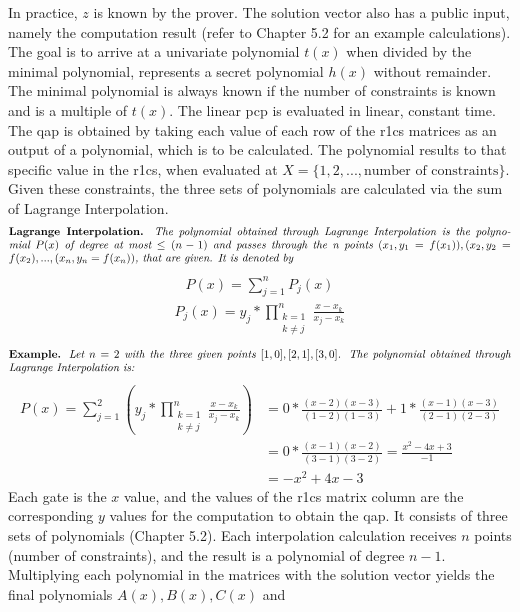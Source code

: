 In practice, \(z\) is known by the prover. The solution vector also has a public input, namely the computation result (refer to Chapter 5.2 for an example calculations). The goal is to arrive at a univariate polynomial \(t(x)\) when divided by the minimal polynomial, represents a secret polynomial \(h(x)\) without remainder. The minimal polynomial is always known if the number of constraints is known and is a multiple of \(t(x)\). The linear \acrshort{pcp} is evaluated in linear, constant time. The \acrshort{qap} is obtained by taking each value of each row of the \acrshort{r1cs} matrices as an output of a polynomial, which is to be calculated. The polynomial results to that specific value in the \acrshort{r1cs}, when evaluated at \(X = \{1, 2, ..., \text{number of constraints}\}\). Given these constraints, the three sets of polynomials are calculated via the sum of Lagrange Interpolation.
\begin{align*}
    \text{\parbox{450pt}{\textbf{Lagrange Interpolation.} \textit{The polynomial obtained through Lagrange Interpolation is the polynomial \(P(x)\) of degree at most \(\leq (n-1)\) and passes through the n points \((x_1, y_1 = f(x_1)), (x_2, y_2 = f(x_2), ..., (x_n, y_n = f(x_n))\), that are given. It is denoted by}}}
\end{align*}
\begin{align}
        P(x) = \sum_{j=1}^{n} P_j(x)
\end{align}
\begin{align*}
        P_j(x) = y_j * \prod_{\substack{k = 1 \\ k \neq j}}^{n}\frac{x-x_k}{x_j-x_k}
\end{align*}
\begin{align*}
    \text{\parbox{450pt}{\textbf{Example.} \textit{Let \(n = 2\) with the three given points \([1,0], [2,1], [3,0]\). The polynomial obtained through Lagrange Interpolation is: 
    }}}
\end{align*}
\begin{align*}
    P(x) = \sum_{j=1}^{2}\left(y_j*\prod_{\substack{k = 1 \\ k \neq j}}^{n}\frac{x-x_k}{x_j-x_k}\right)
    &= 0 * \frac{(x-2)(x-3)}{(1-2)(1-3)}+1*\frac{(x-1)(x-3)}{(2-1)(2-3)}\\
    &= 0 * \frac{(x-1)(x-2)}{(3-1)(3-2)} = \frac{x^2-4x+3}{-1}\\
    &= -x^2+4x-3
\end{align*}
Each gate is the \(x\) value, and the values of the \acrshort{r1cs} matrix column are the corresponding \(y\) values for the computation to obtain the \acrshort{qap}. It consists of three sets of polynomials (Chapter 5.2). Each interpolation calculation receives \(n\) points (number of constraints), and the result is a polynomial of degree \(n-1\). Multiplying each polynomial in the matrices with the solution vector yields the final polynomials \(A(x), B(x), C(x)\) and
